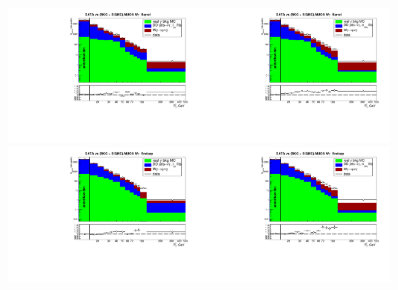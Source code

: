 \begin{figure}[htb]
  \begin{center}
   \includegraphics[width=0.45\textwidth]{../figs/figs_v11/MUON_WGamma/PrepareYields/c_DATAvsBkgPlusSigMCc_MUON_WGamma_TEMPL_CHISO_UNblind__Barrel__phoEt.pdf}\includegraphics[width=0.45\textwidth]{../figs/figs_v11/MUON_WGamma/PrepareYields/c_DATAvsBkgPlusSigMCc_MUON_WGamma_TEMPL_SIHIH_UNblind__Barrel__phoEt.pdf}  \\
   \includegraphics[width=0.45\textwidth]{../figs/figs_v11/MUON_WGamma/PrepareYields/c_DATAvsBkgPlusSigMCc_MUON_WGamma_TEMPL_CHISO_UNblind__Endcap__phoEt.pdf}\includegraphics[width=0.45\textwidth]{../figs/figs_v11/MUON_WGamma/PrepareYields/c_DATAvsBkgPlusSigMCc_MUON_WGamma_TEMPL_SIHIH_UNblind__Endcap__phoEt.pdf}  \\

\end{center}
\end{figure}
